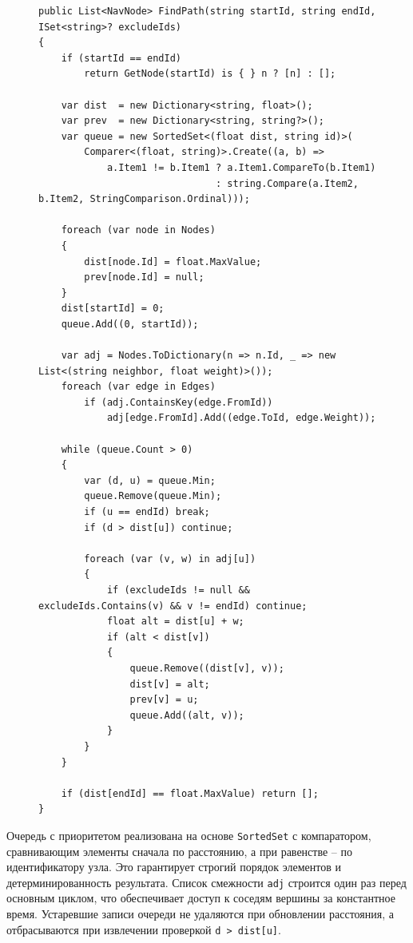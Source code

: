 \begin{figure}[H]
\begin{lstlisting}[language={[Sharp]C}]
public List<NavNode> FindPath(string startId, string endId, ISet<string>? excludeIds)
{
    if (startId == endId)
        return GetNode(startId) is { } n ? [n] : [];

    var dist  = new Dictionary<string, float>();
    var prev  = new Dictionary<string, string?>();
    var queue = new SortedSet<(float dist, string id)>(
        Comparer<(float, string)>.Create((a, b) =>
            a.Item1 != b.Item1 ? a.Item1.CompareTo(b.Item1)
                               : string.Compare(a.Item2, b.Item2, StringComparison.Ordinal)));

    foreach (var node in Nodes)            
    {
        dist[node.Id] = float.MaxValue;
        prev[node.Id] = null;
    }
    dist[startId] = 0;
    queue.Add((0, startId));

    var adj = Nodes.ToDictionary(n => n.Id, _ => new List<(string neighbor, float weight)>());
    foreach (var edge in Edges)
        if (adj.ContainsKey(edge.FromId))
            adj[edge.FromId].Add((edge.ToId, edge.Weight));

    while (queue.Count > 0)
    {
        var (d, u) = queue.Min;            
        queue.Remove(queue.Min);
        if (u == endId) break;
        if (d > dist[u]) continue;         

        foreach (var (v, w) in adj[u])     
        {
            if (excludeIds != null && excludeIds.Contains(v) && v != endId) continue;
            float alt = dist[u] + w;
            if (alt < dist[v])
            {
                queue.Remove((dist[v], v));
                dist[v] = alt;
                prev[v] = u;
                queue.Add((alt, v));
            }
        }
    }

    if (dist[endId] == float.MaxValue) return [];
}
\end{lstlisting}
\end{figure}

Очередь с приоритетом реализована на основе \texttt{SortedSet} с компаратором, сравнивающим элементы сначала по расстоянию, а при равенстве -- по идентификатору узла. Это гарантирует строгий порядок элементов и детерминированность результата. Список смежности \texttt{adj} строится один раз перед основным циклом, что обеспечивает доступ к соседям вершины за константное время. Устаревшие записи очереди не удаляются при обновлении расстояния, а отбрасываются при извлечении проверкой \texttt{d > dist[u]}.

